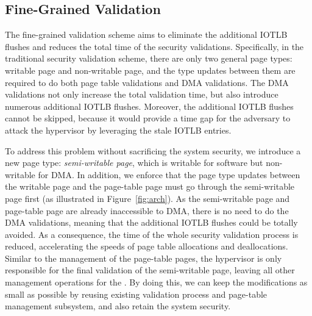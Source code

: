 \subsection{Fine-Grained Validation}\label{sec:fine-grained}
The fine-grained validation scheme aims to eliminate the additional IOTLB flushes and reduces the total time of the security validations.
Specifically, in the traditional security validation scheme, there are only two general page types: writable page and non-writable page,
and the type updates between them are required to do both page table validations and DMA validations.
The DMA validations not only increase the total validation time, but also introduce numerous additional IOTLB flushes.
Moreover, the additional IOTLB flushes cannot be skipped, because it would provide a time gap for the adversary to attack the hypervisor by leveraging the stale IOTLB entries.

To address this problem without sacrificing the system security, we introduce a new page type: \emph{semi-writable page}, which is writable for software but non-writable for DMA.
In addition, we enforce that the page type updates between the writable page and the page-table page must go through the semi-writable page first (as illustrated in Figure~\ref{fig:arch}).
As the semi-writable page and page-table page are already inaccessible to DMA, there is no need to do the DMA validations, meaning that the additional IOTLB flushes could be totally avoided.
As a consequence, the time of the whole security validation process is reduced, accelerating the speeds of page table allocations and deallocations.
Similar to the management of the page-table pages, the hypervisor is only responsible for the final validation of the semi-writable page, leaving all other management operations for the \cache.
By doing this, we can keep the modifications as small as possible by reusing existing validation process and page-table management subsystem, and also retain the system security.


